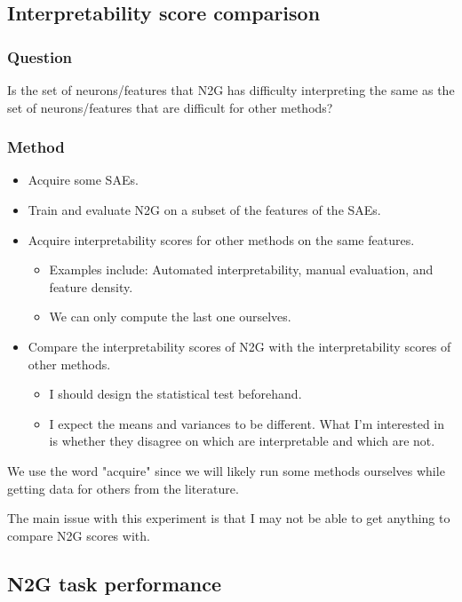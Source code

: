 \documentclass[../main.tex]{subfiles}
\begin{document}
\subsection{Interpretability score comparison}
\subsubsection{Question}
Is the set of neurons/features that N2G has difficulty interpreting the same as the set of neurons/features that are difficult for other methods?

\subsubsection{Method}
\begin{itemize}
    \item Acquire some SAEs.
    \item Train and evaluate N2G on a subset of the features of the SAEs.
    \item Acquire interpretability scores for other methods on the same features.
    \begin{itemize}
        \item Examples include: Automated interpretability, manual evaluation, and feature density.
        \item We can only compute the last one ourselves.
    \end{itemize}
    \item Compare the interpretability scores of N2G with the interpretability scores of other methods.
    \begin{itemize}
        \item I should design the statistical test beforehand.
        \item I expect the means and variances to be different.
        What I'm interested in is whether they disagree on which are interpretable and which are not.
    \end{itemize}
\end{itemize}
We use the word "acquire" since we will likely run some methods ourselves while getting data for others from the literature.

The main issue with this experiment is that I may not be able to get anything to compare N2G scores with.

\subsection{N2G task performance}
\end{document}
